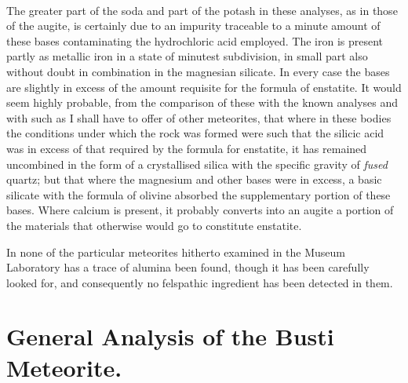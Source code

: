 \documentclass[a4paper, 12pt, oneside]{article}
\begin{document}
\paragraph{}
The greater part of the soda and part of the potash in these analyses, as in those of the augite, is certainly due to an impurity traceable to a minute amount of these bases contaminating the hydrochloric acid employed. The iron is present partly as metallic iron in a state of minutest subdivision, in small part also without doubt in combination in the magnesian silicate. In every case the bases are slightly in excess of the amount requisite for the formula of enstatite. It would seem highly probable, from the comparison of these with the known analyses and with such as I shall have to offer of other meteorites, that where in these bodies the conditions under which the rock was formed were such that the silicic acid was in excess of that required by the formula for enstatite, it has remained uncombined in the form of a crystallised silica with the specific gravity of \emph{fused} quartz; but that where the magnesium and other bases were in excess, a basic silicate with the formula of olivine absorbed the supplementary portion of these bases. Where calcium is present, it probably converts into an augite a portion of the materials that otherwise would go to constitute enstatite.

In none of the particular meteorites hitherto examined in the Museum Laboratory has a trace of alumina been found, though it has been carefully looked for, and consequently no felspathic ingredient has been detected in them.
\clearpage
\section{General Analysis of the Busti Meteorite.}
\end{document}
